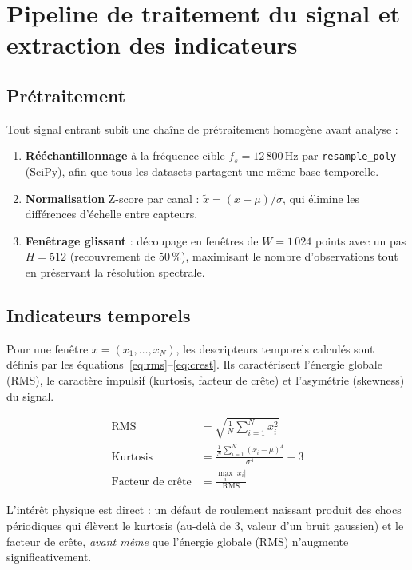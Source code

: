 \chapter{Pipeline de traitement du signal et extraction des indicateurs}
\label{chap:pipeline}

\section{Prétraitement}
Tout signal entrant subit une chaîne de prétraitement homogène avant analyse :
\begin{enumerate}[leftmargin=1.6em]
  \item \textbf{Rééchantillonnage} à la fréquence cible $f_s = 12\,800$\,Hz par
        \texttt{resample\_poly} (SciPy), afin que tous les datasets partagent une même
        base temporelle.
  \item \textbf{Normalisation} Z-score par canal : $\tilde{x} = (x-\mu)/\sigma$, qui
        élimine les différences d'échelle entre capteurs.
  \item \textbf{Fenêtrage glissant} : découpage en fenêtres de $W=1\,024$ points avec un
        pas $H=512$ (recouvrement de 50\,\%), maximisant le nombre d'observations tout en
        préservant la résolution spectrale.
\end{enumerate}

\section{Indicateurs temporels}
Pour une fenêtre $x = (x_1,\dots,x_N)$, les descripteurs temporels calculés sont définis
par les équations~\eqref{eq:rms}--\eqref{eq:crest}. Ils caractérisent l'énergie globale
(RMS), le caractère impulsif (kurtosis, facteur de crête) et l'asymétrie (skewness) du
signal.

\begin{align}
\text{RMS} &= \sqrt{\tfrac{1}{N}\textstyle\sum_{i=1}^{N} x_i^{2}} \label{eq:rms}\\
\text{Kurtosis} &= \frac{\tfrac{1}{N}\sum_{i=1}^{N}(x_i-\mu)^4}{\sigma^{4}} - 3 \label{eq:kurt}\\
\text{Facteur de crête} &= \frac{\max_i |x_i|}{\text{RMS}} \label{eq:crest}
\end{align}

L'intérêt physique est direct : un défaut de roulement naissant produit des chocs
périodiques qui élèvent le kurtosis (au-delà de 3, valeur d'un bruit gaussien) et le facteur
de crête, \emph{avant même} que l'énergie globale (RMS) n'augmente significativement.


